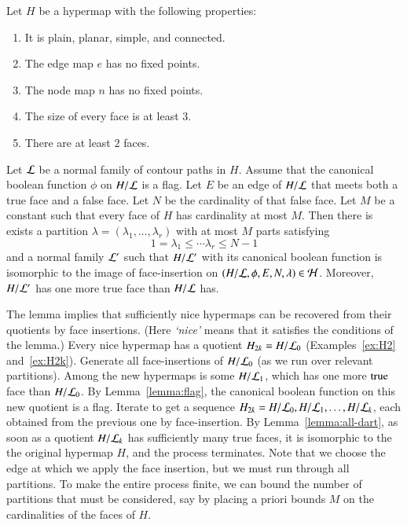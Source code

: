 \begin{theorem}  Let $H$ be a hypermap with the following properties:
    \begin{enumerate}
        \item It is plain, planar, simple, and connected.
        \item The edge map $e$ has no fixed points.
        \item The node map $n$ has no fixed points.
        \item The size of every face is at least $3$.
        \item There are at least $2$ faces. 
    \end{enumerate}
Let $\cal L$ be a normal family of contour paths in $H$. Assume that
the canonical boolean function $\phi$ on $H/{\cal L}$ is a flag. Let
$E$ be an edge of $H/{\cal L}$ that meets both a true face
and a false face. Let $N$ be the cardinality of that false face. Let
$M$ be a constant such that every face of $H$ has cardinality at
most $M$. Then there is exists a partition $\lambda=(\lambda_1,\ldots,\lambda_r)$ with at most
$M$ parts satisfying $$1=\lambda_1\le \cdots\lambda_r \le N-1$$
and a normal family
${\cal L}'$ such that $H/{\cal L}'$ with its canonical boolean
function is isomorphic to the image of face-insertion on
$(H/{\cal L},\phi,E,N,\lambda)\in {\cal H}$. 
Moreover, $H/{\cal L}'$
has one more true face than $H/{\cal L}$ has.
\end{theorem}

\begin{remark} The lemma implies that sufficiently nice hypermaps can be recovered
from their quotients by face insertions.  (Here {\it `nice'} means
that it satisfies the conditions of the lemma.)  
Every nice hypermap has a quotient 
$H_{2k}=H/{\cal L}_0$
(Examples~\ref{ex:H2} and~\ref{ex:H2k}).
Generate all face-insertions of $H/{\cal L}_0$ 
(as we run over relevant partitions).
Among the new hypermaps is some $H/{\cal L}_1$, which
has one more ${\operatorname{true}}$ face than $H/{\cal L}_0$.  By 
Lemma~\ref{lemma:flag}, 
the canonical boolean function on this new quotient
is a flag.  Iterate to get a sequence
$H_{2k} = H/{\cal L}_0, H/{\cal L}_1,\ldots, H/{\cal L}_k$,
each obtained from the previous one by face-insertion.
By Lemma~\ref{lemma:all-dart}, 
as
soon as a quotient $H/{\cal L}_k$ 
has sufficiently many true faces, it is
isomorphic to the the original hypermap $H$, and the process
terminates.
Note that we choose the edge at which we apply the face
insertion, but we must run through
all partitions.  To make the entire process finite, we can bound the
number of partitions that must be considered, say by placing a
priori bounds $M$ on the cardinalities of the faces of $H$.
\end{remark}

